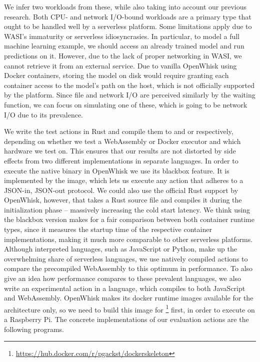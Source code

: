 We infer two workloads from these, while also taking into account our previous research. Both CPU- and network I/O-bound workloads are a primary type that ought to be handled well by a serverless platform. Some limitations apply due to WASI's immaturity or serverless idiosyncrasies. In particular, to model a full machine learning example, we should access an already trained model and run predictions on it. However, due to the lack of proper networking in WASI, we cannot retrieve it from an external service. Due to vanilla OpenWhisk using Docker containers, storing the model on disk would require granting each container access to the model's path on the host, which is not officially supported by the platform. Since file and network I/O are perceived similarly by the waiting function, we can focus on simulating one of these, which is going to be network I/O due to its prevalence.

We write the test actions in Rust and compile them to  and  or  respectively, depending on whether we test a WebAssembly or Docker executor and which hardware we test on. This ensures that our results are not distorted by side effects from two different implementations in separate languages. In order to execute the native binary in OpenWhisk we use its blackbox feature. It is implemented by the  image, which lets us execute any action that adheres to a JSON-in, JSON-out protocol. We could also use the official Rust support by OpenWhisk, however, that takes a Rust source file and compiles it during the initialization phase -- massively increasing the cold start latency. We think using the blackbox version makes for a fair comparison between both container runtime types, since it measures the startup time of the respective container implementations, making it much more comparable to other serverless platforms. Although interpreted languages, such as JavaScript or Python, make up the overwhelming share of serverless languages, we use natively compiled actions to compare the precompiled WebAssembly to this optimum in performance. To also give an idea how performance compares to these prevalent languages, we also write an experimental action in a language, which compiles to both JavaScript and WebAssembly.
OpenWhisk makes its docker runtime images available for the  architecture only, so we need to build this image for \footnote{\url{https://hub.docker.com/r/pgackst/dockerskeleton}} first, in order to execute on a Raspberry Pi. The concrete implementations of our evaluation actions are the following programs.

